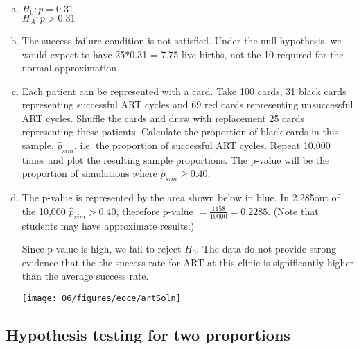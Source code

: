 {
\begin{enumerate}[(a)]
\setlength{\itemsep}{0mm}
\item $H_0: p = 0.31$ \\
$H_A: p > 0.31$
\item The success-failure condition is not satisfied. Under the null hypothesis, we would expect to have 25*0.31 = 7.75 
live births, not the 10 required for the normal approximation.
\item Each patient can be represented with a card. Take 100 cards, 31 black cards representing successful ART cycles and 69 red cards representing unsuccessful ART cycles. Shuffle the cards and draw with replacement 25 cards representing these patients. Calculate the proportion of black cards in this sample, $\hat{p}_{sim}$, i.e. the proportion of successful ART cycles. Repeat 10,000 times and plot the resulting sample proportions. The p-value will be the proportion of simulations where $\hat{p}_{sim} \ge 0.40$.
\item The p-value is represented by the area shown below in blue. In 2,285out of the 10,000 $\hat{p}_{sim} > 0.40$, therefore p-value $= \frac{1158}{10000} = 0.2285$. (Note that students may have approximate results.) 
\noindent \begin{minipage}[c]{0.5\textwidth}
Since p-value is high, we fail to reject $H_0$. The data do not provide strong evidence that the the success rate for ART at this clinic is significantly higher than the average success rate.
\end{minipage}
\begin{minipage}[c]{0.5\textwidth}
\begin{center}
\texttt{[image: 06/figures/eoce/artSoln]}
\end{center}
\end{minipage}
\end{enumerate}
}


\subsection{Hypothesis testing for two proportions}



